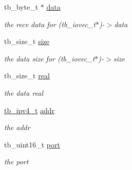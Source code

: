 \begin{DoxyCompactItemize}
\item 
\hypertarget{structtb__aice__urecv__t_ab5125bf01b32cc94a853ba50ae29771f}{tb\-\_\-byte\-\_\-t $\ast$ \hyperlink{structtb__aice__urecv__t_ab5125bf01b32cc94a853ba50ae29771f}{data}}\label{structtb__aice__urecv__t_ab5125bf01b32cc94a853ba50ae29771f}

\begin{DoxyCompactList}\small\item\em the recv data for (tb\-\_\-iovec\-\_\-t$\ast$)-\/$>$data \end{DoxyCompactList}\item 
\hypertarget{structtb__aice__urecv__t_a684104b2da6409eee35a383b2fc90ace}{tb\-\_\-size\-\_\-t \hyperlink{structtb__aice__urecv__t_a684104b2da6409eee35a383b2fc90ace}{size}}\label{structtb__aice__urecv__t_a684104b2da6409eee35a383b2fc90ace}

\begin{DoxyCompactList}\small\item\em the data size for (tb\-\_\-iovec\-\_\-t$\ast$)-\/$>$size \end{DoxyCompactList}\item 
\hypertarget{structtb__aice__urecv__t_ad9b9bd4228d5429bb6dccc0814deeaf4}{tb\-\_\-size\-\_\-t \hyperlink{structtb__aice__urecv__t_ad9b9bd4228d5429bb6dccc0814deeaf4}{real}}\label{structtb__aice__urecv__t_ad9b9bd4228d5429bb6dccc0814deeaf4}

\begin{DoxyCompactList}\small\item\em the data real \end{DoxyCompactList}\item 
\hypertarget{structtb__aice__urecv__t_a49903b63e663578e00307362b6767396}{\hyperlink{uniontb__ipv4__t}{tb\-\_\-ipv4\-\_\-t} \hyperlink{structtb__aice__urecv__t_a49903b63e663578e00307362b6767396}{addr}}\label{structtb__aice__urecv__t_a49903b63e663578e00307362b6767396}

\begin{DoxyCompactList}\small\item\em the addr \end{DoxyCompactList}\item 
\hypertarget{structtb__aice__urecv__t_aa79a47846c5f096294d891a0f9a5d508}{tb\-\_\-uint16\-\_\-t \hyperlink{structtb__aice__urecv__t_aa79a47846c5f096294d891a0f9a5d508}{port}}\label{structtb__aice__urecv__t_aa79a47846c5f096294d891a0f9a5d508}

\begin{DoxyCompactList}\small\item\em the port \end{DoxyCompactList}\end{DoxyCompactItemize}


